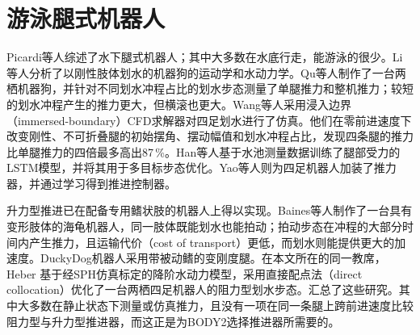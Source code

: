 \section{游泳腿式机器人}
\label{sec:rw-robots}

Picardi等人\cite{Picardi2023}综述了水下腿式机器人；其中大多数在水底行走，能游泳的很少。Li等人\cite{Li2019}分析了以刚性肢体划水的机器狗的运动学和水动力学。Qu等人\cite{Qu2025}制作了一台两栖机器狗，并针对不同划水冲程占比的划水步态测量了单腿推力和整机推力；较短的划水冲程产生的推力更大，但横滚也更大。Wang等人\cite{Wang2025}采用浸入边界（immersed-boundary）CFD求解器对四足划水进行了仿真。他们在零前进速度下改变刚性、不可折叠腿的初始摆角、摆动幅值和划水冲程占比，发现四条腿的推力比单腿推力的四倍最多高出87\,\%。Han等人\cite{Han2025}基于水池测量数据训练了腿部受力的LSTM模型，并将其用于多目标步态优化。Yao等人\cite{Yao2023}则为四足机器人加装了推力器，并通过学习得到推进控制器。

升力型推进已在配备专用鳍状肢的机器人上得以实现。Baines等人\cite{Baines2022}制作了一台具有变形肢体的海龟机器人，同一肢体既能划水也能拍动；拍动步态在冲程的大部分时间内产生推力，且运输代价（cost of transport）更低，而划水则能提供更大的加速度。DuckyDog机器人采用带被动鳍的变刚度腿\cite{Wang2025DuckyDog}。在本文所在的同一教席，Heber \cite{Heber2026}基于经SPH仿真标定的降阶水动力模型，采用直接配点法（direct collocation）优化了一台两栖四足机器人的阻力型划水步态。汇总了这些研究。其中大多数在静止状态下测量或仿真推力，且没有一项在同一条腿上跨前进速度比较阻力型与升力型推进器，而这正是为BODY2选择推进器所需要的。

